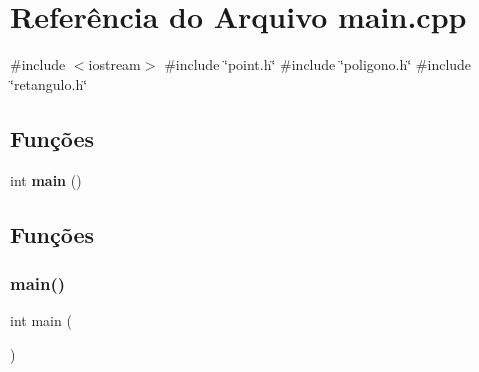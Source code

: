 \section{Referência do Arquivo main.\+cpp}
\label{main_8cpp}
{\ttfamily \#include $<$iostream$>$}\newline
{\ttfamily \#include \char`\"{}point.\+h\char`\"{}}\newline
{\ttfamily \#include \char`\"{}poligono.\+h\char`\"{}}\newline
{\ttfamily \#include \char`\"{}retangulo.\+h\char`\"{}}\newline
\subsection*{Funções}
\begin{DoxyCompactItemize}
\item 
int \textbf{ main} ()
\end{DoxyCompactItemize}


\subsection{Funções}
\mbox{\label{main_8cpp_ae66f6b31b5ad750f1fe042a706a4e3d4}} 
\subsubsection{main()}
{\footnotesize\ttfamily int main (\begin{DoxyParamCaption}{ }\end{DoxyParamCaption})}


